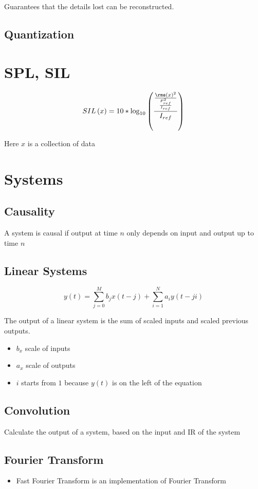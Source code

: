     Guarantees that the details lost can be reconstructed.

  \subsection{Quantization}

\section{SPL, SIL}

  \begin{equation}
    SIL\left( x \right) = 10 * \log_{10}
    \left(
      \frac
      {
        \frac
        {
          \rms\left( x \right)^{2}
        }
        {
          \frac{P_{ref}^{2}}{I_{ref}}
        }
      }
      {I_{ref}}
    \right)
  \end{equation}

  Here $ x $ is a collection of data

\section{Systems}

  \subsection{Causality}

    A system is causal if output at time $ n $ only depends on input and output
    up to time $ n $

  \subsection{Linear Systems}

    \begin{equation}
      y\left( t \right) =
        \sum_{j = 0}^{M} b_{j} x\left( t - j \right)
        + \sum_{i = 1}^{N} a_{i} y\left( t - ji \right)
    \end{equation}

    The output of a linear system is the sum of scaled inputs and
    scaled previous outputs.

    \begin{itemize}
      \item $ b_{x} $ scale of inputs
      \item $ a_{x} $ scale of outputs
      \item $ i $ starts from $ 1 $ because $ y\left( t \right) $ is on the left
      of the equation
    \end{itemize}

  \subsection{Convolution}

    Calculate the output of a system, based on the input and IR of the system

  \subsection{Fourier Transform}

    \begin{itemize}
      \item Fast Fourier Transform is an implementation of Fourier Transform
    \end{itemize}

